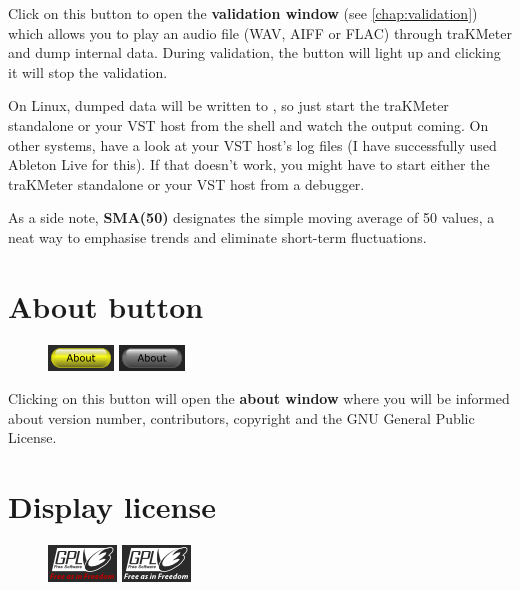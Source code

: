 Click on this button to open the \textbf{validation window} (see
\ref{chap:validation}) which allows you to play an audio file (WAV,
AIFF or FLAC) through traKMeter and dump internal data.  During
validation, the button will light up and clicking it will stop the
validation.

On Linux, dumped data will be written to , so just start
the traKMeter standalone or your VST host from the shell and watch the
output coming.  On other systems, have a look at your VST host's log
files (I have successfully used Ableton Live for this).  If that
doesn't work, you might have to start either the traKMeter standalone
or your VST host from a debugger.

As a side note, \textbf{SMA(50)} designates the simple moving average
of 50 values, a neat way to emphasise trends and eliminate short-term
fluctuations.

\section{About button}

\begin{figure}
  \includegraphics[scale=\screenshotscale,clip]{include/images/button_about_on.png}
  \newline \vspace{-0.9\baselineskip}
  \includegraphics[scale=\screenshotscale,clip]{include/images/button_about_off.png}
\end{figure}

Clicking on this button will open the \textbf{about window} where you
will be informed about version number, contributors, copyright and the
GNU General Public License.

\section{Display license}

\begin{figure}
  \includegraphics[scale=\screenshotscale,clip]{include/images/button_gpl_on.png}
  \newline \vspace{-0.9\baselineskip}
  \includegraphics[scale=\screenshotscale,clip]{include/images/button_gpl_off.png}
\end{figure}

